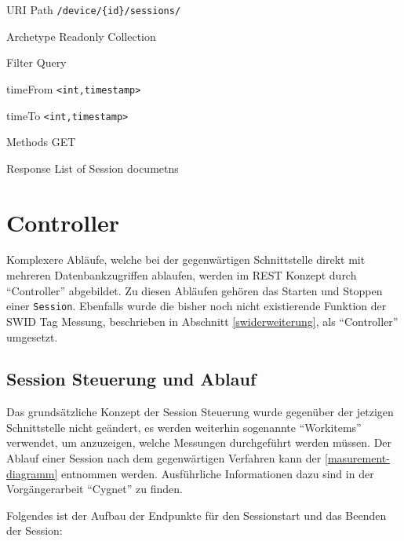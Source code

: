\begin{mdframed}[style=def]
\begin{description*}
	\item[URI Path] \texttt{/device/\{id\}/sessions/}
	\item[Archetype] Readonly Collection
	\item[Filter Query] \hfill
	\begin{description*}
		\item[timeFrom] \texttt{<int,timestamp>}
		\item[timeTo] \texttt{<int,timestamp>}
	\end{description*}	
	\item[Methods] GET
	\item[Response] List of Session documetns
\end{description*}
\end{mdframed}

\section{Controller}
Komplexere Abläufe, welche bei der gegenwärtigen Schnittstelle direkt mit
mehreren Datenbankzugriffen ablaufen, werden im REST Konzept durch
\enquote{Controller} abgebildet. Zu diesen Abläufen gehören das Starten und
Stoppen einer \texttt{Session}. Ebenfalls wurde die bisher noch nicht
existierende Funktion der SWID Tag Messung, beschrieben in Abschnitt
\ref{swiderweiterung}, als \enquote{Controller} umgesetzt.

\subsection{Session Steuerung und Ablauf}
Das grundsätzliche Konzept der Session Steuerung wurde gegenüber der jetzigen
Schnittstelle nicht geändert, es werden weiterhin sogenannte \enquote{Workitems}
verwendet, um anzuzeigen, welche Messungen durchgeführt werden müssen. Der Ablauf
einer Session nach dem gegenwärtigen Verfahren kann der 
\autoref{masurement-diagramm} entnommen werden. Ausführliche
Informationen dazu sind in der Vorgängerarbeit
\enquote{Cygnet}\cite{cygnet:2013} zu finden.

Folgendes ist der Aufbau der Endpunkte für den Sessionstart und das Beenden der
Session:


